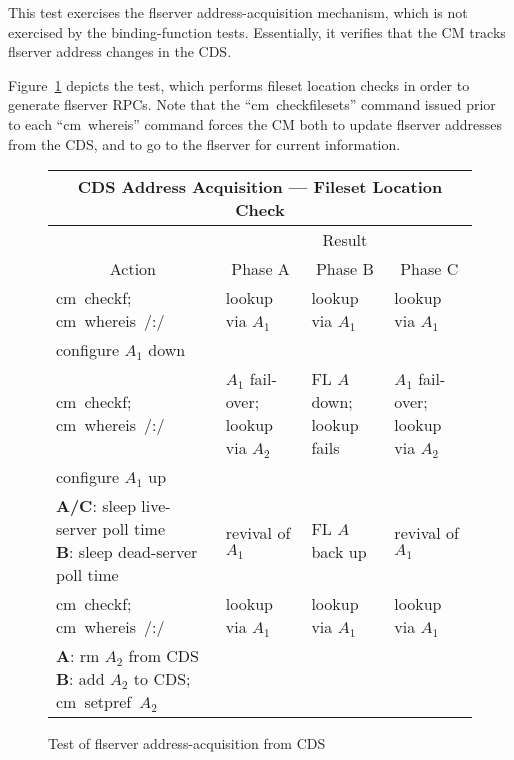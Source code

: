This test exercises the flserver address-acquisition mechanism, which
is not exercised by the binding-function tests.  Essentially, it
verifies that the CM tracks flserver address changes in the CDS.

Figure~\ref{fig:floc} depicts the test, which performs fileset
location checks in order to generate flserver RPCs.  Note
that the ``cm~checkfilesets'' command issued prior to each ``cm~whereis''
command forces the CM both to update flserver addresses from
the CDS, and to go to the flserver for current information.


\begin{figure}
\begin{tabular}{|p{1.4in}|p{0.9in}|p{0.9in}|p{0.9in}|}
\hline
\multicolumn{4}{|c|}{CDS Address Acquisition --- Fileset Location Check} \\
\hline
\hline
 & \multicolumn{3}{c|}{Result} \\ \cline{2-4}
\multicolumn{1}{|c|}{Action} & \multicolumn{1}{c|}{Phase A} &
    \multicolumn{1}{c|}{Phase B} & \multicolumn{1}{c|}{Phase C} \\
%
\hline
{\raggedright cm~checkf;\\cm~whereis~/:/} &
{\raggedright lookup via $A_{1}$} &
{\raggedright lookup via $A_{1}$} &
{\raggedright lookup via $A_{1}$} \\
%
\hline
{\raggedright configure $A_{1}$ down} & & & \\
%
\hline
{\raggedright cm~checkf;\\cm~whereis~/:/} &
{\raggedright $A_{1}$ fail-over;\\lookup via $A_{2}$} &
{\raggedright FL $A$ down;\\lookup fails} &
{\raggedright $A_{1}$ fail-over;\\lookup via $A_{2}$} \\
%
\hline
{\raggedright configure $A_{1}$ up} & & & \\
%
\hline
{\raggedright
  {\bf A/C}: sleep live-server poll time\\
  {\bf B}: sleep dead-server poll time} &
{\raggedright revival of $A_{1}$} &
{\raggedright FL $A$ back up} &
{\raggedright revival of $A_{1}$} \\
%
\hline
{\raggedright cm~checkf;\\cm~whereis~/:/} &
{\raggedright lookup via $A_{1}$} &
{\raggedright lookup via $A_{1}$} &
{\raggedright lookup via $A_{1}$} \\
%
\hline
{\raggedright
  {\bf A}: rm $A_{2}$ from CDS\\
  {\bf B}: add $A_{2}$ to CDS;\\cm~setpref~$A_{2}$} & & & \\
%
\hline
\end{tabular}
\caption{Test of flserver address-acquisition from CDS}
\label{fig:floc}
\end{figure}




